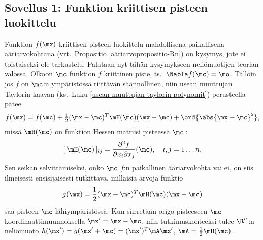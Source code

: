 \subsection*{Sovellus 1: Funktion kriittisen pisteen luokittelu}

Funktion $f(\mx)$ kriittisen pisteen luokittelu mahdollisena paikallisena ääriarvokohtana
(vrt.\ Propositio \ref{ääriarvopropositio-Rn}) on kysymys, jote ei toistaiseksi ole tarkastelu.
Palataan nyt tähän kysymykseen neliömuotijen teorian valossa. Olkoon $\mc$ funktion $f$
kriittinen piste, ts.\ $\Nabla f(\mc)=\mo$. Tällöin jos $f$ on $\mc$:n ympäristössä riittävän
säännöllinen, niin usean muuttujan Taylorin kaavan (ks.\ Luku
\ref{usean muuttujan taylorin polynomit}) perusteella pätee
\[
f(\mx) = f(\mc)+\tfrac{1}{2}(\mx-\mc)^T\mH(\mc)(\mx-\mc)+\ord{\abs{\mx-\mc}^2},
\]
missä $\mH(\mc)$ on funktion Hessen matriisi pisteessä $\mc\,$:
\[
[\,\mH(\mc)\,]_{ij}=\frac{\partial^2 f}{\partial x_i\partial x_j}(\mc),\quad i,j=1\ldots n.
\]
Sen seikan selvittämiseksi, onko $\mc$ $f$:n paikallinen ääriarvokohta vai ei, on siis
ilmeisesti ensisijaisesti tutkittava, millaisia arvoja funktio
\[
g(\mx)=\frac{1}{2}(\mx-\mc)^T\mH(\mc)(\mx-\mc)
\]
saa pisteen $\mc$ lähiympäristössä. Kun siirretään origo pisteeseen $\mc$ 
koordinaattimuunnoksella $\mx'=\mx-\mc$, niin tutkimuskohteeksi tulee $\R^n$:n neliömuoto
$h(\mx')=g(\mx'+\mc) = (\mx')^T\mA\mx'$, $\mA=\frac{1}{2}\mH(\mc)$.

